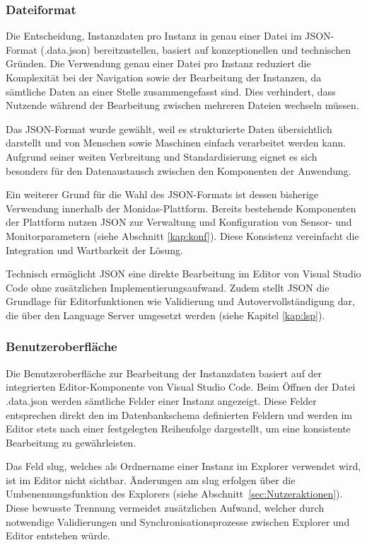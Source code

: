 \subsubsection*{Dateiformat}
Die Entscheidung, Instanzdaten pro Instanz in genau einer Datei im JSON-Format (.data.json) bereitzustellen, basiert auf konzeptionellen und technischen Gründen. Die Verwendung genau einer Datei pro Instanz reduziert die Komplexität bei der Navigation sowie der Bearbeitung der Instanzen, da sämtliche Daten an einer Stelle zusammengefasst sind. Dies verhindert, dass Nutzende während der Bearbeitung zwischen mehreren Dateien wechseln müssen.

Das JSON-Format wurde gewählt, weil es strukturierte Daten übersichtlich darstellt und von Menschen sowie Maschinen einfach verarbeitet werden kann. Aufgrund seiner weiten Verbreitung und Standardisierung eignet es sich besonders für den Datenaustausch zwischen den Komponenten der Anwendung.

Ein weiterer Grund für die Wahl des JSON-Formats ist dessen bisherige Verwendung innerhalb der Monidas-Plattform. Bereits bestehende Komponenten der Plattform nutzen JSON zur Verwaltung und Konfiguration von Sensor- und Monitorparametern (siehe Abschnitt \ref{kap:konf}). Diese Konsistenz vereinfacht die Integration und Wartbarkeit der Lösung.

Technisch ermöglicht JSON eine direkte Bearbeitung im Editor von Visual Studio Code ohne zusätzlichen Implementierungsaufwand. Zudem stellt JSON die Grundlage für Editorfunktionen wie Validierung und Autovervollständigung dar, die über den Language Server umgesetzt werden (siehe Kapitel \ref{kap:lsp}).

\newpage
\subsubsection*{Benutzeroberfläche}
Die Benutzeroberfläche zur Bearbeitung der Instanzdaten basiert auf der integrierten Editor-Komponente von Visual Studio Code. Beim Öffnen der Datei .data.json werden sämtliche Felder einer Instanz angezeigt. Diese Felder entsprechen direkt den im Datenbankschema definierten Feldern und werden im Editor stets nach einer festgelegten Reihenfolge dargestellt, um eine konsistente Bearbeitung zu gewährleisten.

Das Feld slug, welches als Ordnername einer Instanz im Explorer verwendet wird, ist im Editor nicht sichtbar. Änderungen am slug erfolgen über die Umbenennungsfunktion des Explorers (siehe Abschnitt~\ref{sec:Nutzeraktionen}). Diese bewusste Trennung vermeidet zusätzlichen Aufwand, welcher durch notwendige Validierungen und Synchronisationsprozesse zwischen Explorer und Editor entstehen würde.

